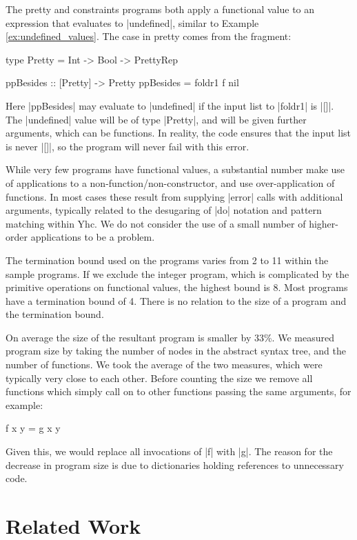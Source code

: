 \documentclass[preprint]{sigplanconf}
\begin{document}
The pretty and constraints programs both apply a functional value to an expression that evaluates to |undefined|, similar to Example \ref{ex:undefined_values}. The case in pretty comes from the fragment:

\begin{code}
type Pretty = Int -> Bool -> PrettyRep

ppBesides     :: [Pretty] -> Pretty
ppBesides = foldr1 f nil
\end{code}

Here |ppBesides| may evaluate to |undefined| if the input list to |foldr1| is |[]|. The |undefined| value will be of type |Pretty|, and will be given further arguments, which can be functions. In reality, the code ensures that the input list is never |[]|, so the program will never fail with this error.

While very few programs have functional values, a substantial number make use of applications to a non-function/non-constructor, and use over-application of functions. In most cases these result from supplying |error| calls with additional arguments, typically related to the desugaring of |do| notation and pattern matching within Yhc. We do not consider the use of a small number of higher-order applications to be a problem.

The termination bound used on the programs varies from 2 to 11 within the sample programs. If we exclude the integer program, which is complicated by the primitive operations on functional values, the highest bound is 8. Most programs have a termination bound of 4. There is no relation to the size of a program and the termination bound.

On average the size of the resultant program is smaller by 33\%. We measured program size by taking the number of nodes in the abstract syntax tree, and the number of functions. We took the average of the two measures, which were typically very close to each other. Before counting the size we remove all functions which simply call on to other functions passing the same arguments, for example:

\begin{code}
f x y = g x y
\end{code}

Given this, we would replace all invocations of |f| with |g|. The reason for the decrease in program size is due to dictionaries holding references to unnecessary code.

\section{Related Work}
\label{sec:related}
\end{document}
